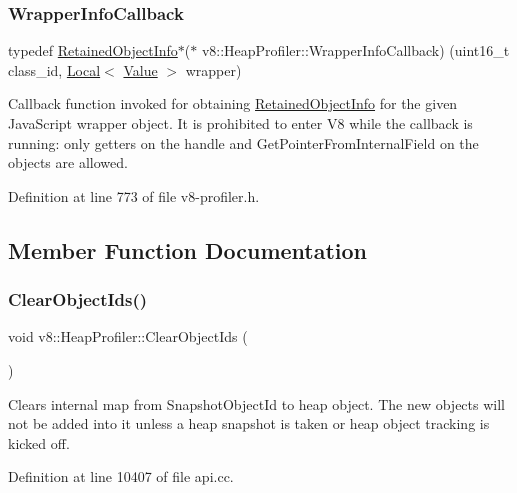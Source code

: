 \subsubsection{\texorpdfstring{Wrapper\+Info\+Callback}{WrapperInfoCallback}}
{\footnotesize\ttfamily typedef \mbox{\hyperlink{classv8_1_1RetainedObjectInfo}{Retained\+Object\+Info}}$\ast$($\ast$ v8\+::\+Heap\+Profiler\+::\+Wrapper\+Info\+Callback) (uint16\+\_\+t class\+\_\+id, \mbox{\hyperlink{classv8_1_1Local}{Local}}$<$ \mbox{\hyperlink{classv8_1_1Value}{Value}} $>$ wrapper)}

Callback function invoked for obtaining \mbox{\hyperlink{classv8_1_1RetainedObjectInfo}{Retained\+Object\+Info}} for the given Java\+Script wrapper object. It is prohibited to enter V8 while the callback is running\+: only getters on the handle and Get\+Pointer\+From\+Internal\+Field on the objects are allowed. 

Definition at line 773 of file v8-\/profiler.\+h.



\subsection{Member Function Documentation}
\mbox{\label{classv8_1_1HeapProfiler_a8a90c630543ed1875cbf9166239ff8d3}} 
\subsubsection{\texorpdfstring{Clear\+Object\+Ids()}{ClearObjectIds()}}
{\footnotesize\ttfamily void v8\+::\+Heap\+Profiler\+::\+Clear\+Object\+Ids (\begin{DoxyParamCaption}{ }\end{DoxyParamCaption})}

Clears internal map from Snapshot\+Object\+Id to heap object. The new objects will not be added into it unless a heap snapshot is taken or heap object tracking is kicked off. 

Definition at line 10407 of file api.\+cc.

\mbox{\label{classv8_1_1HeapProfiler_a6a75bcc6d8350858597b6a6ce5e349a2}} 
